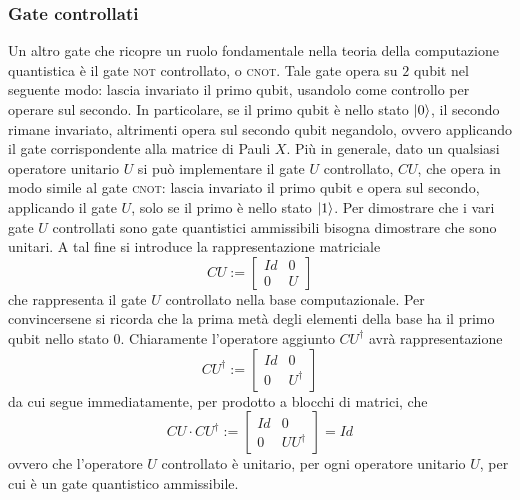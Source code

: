 \subsubsection{Gate controllati}
Un altro gate che ricopre un ruolo fondamentale nella teoria della computazione quantistica è il gate \textsc{not} controllato, o \textsc{cnot}.
Tale gate opera su $2$ qubit nel seguente modo: lascia invariato il primo qubit, usandolo come controllo per operare sul secondo.
In particolare, se il primo qubit è nello stato $\ket{0}$, il secondo rimane invariato, altrimenti opera sul secondo qubit negandolo, ovvero applicando il gate corrispondente alla matrice di Pauli $X$.
Più in generale, dato un qualsiasi operatore unitario $U$ si può implementare il gate $U$ controllato, $CU$, che opera in modo simile al gate \textsc{cnot}: lascia invariato il primo qubit e opera sul secondo, applicando il gate $U$, solo se il primo è nello stato $\ket{1}$.
Per dimostrare che i vari gate $U$ controllati sono gate quantistici ammissibili bisogna dimostrare che sono unitari. A tal fine si introduce la rappresentazione matriciale
\begin{equation}
CU := \left[
 \begin{array}{c|c}
  Id & 0 \\ 
  \hline
  0 & U
 \end{array}
 \right]
\end{equation}
che rappresenta il gate $U$ controllato nella base computazionale.
Per convincersene si ricorda che la prima metà degli elementi della base ha il primo qubit nello stato 0.
Chiaramente l'operatore aggiunto $CU^\dag$ avrà rappresentazione
\begin{equation}
CU^\dag := \left[
 \begin{array}{c|c}
  Id & 0 \\ 
  \hline
  0 & U^\dag
 \end{array}
 \right]
\end{equation}
da cui segue immediatamente, per prodotto a blocchi di matrici, che
\begin{equation}
CU \cdot CU^\dag := \left[
 \begin{array}{c|c}
  Id & 0 \\ 
  \hline
  0 & U U^\dag
 \end{array}
 \right] = Id
\end{equation}
ovvero che l'operatore $U$ controllato è unitario, per ogni operatore unitario $U$, per cui è un gate quantistico ammissibile.

